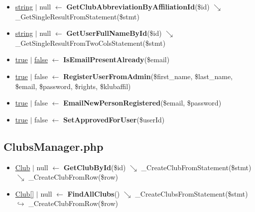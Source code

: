 \begin{itemize}
  \item \underline{string} $\vert$ null $\leftarrow$ \textbf{GetClubAbbreviationByAffiliationId}(\$id)
  \newline    $\searrow$ \_GetSingleResultFromStatement(\$stmt)
  \item \underline{string} $\vert$ null $\leftarrow$ \textbf{GetUserFullNameById}(\$id)
  \newline    $\searrow$ \_GetSingleResultFromTwoColsStatement(\$stmt)
  \item \underline{true} $\vert$ \underline{false} $\leftarrow$ \textbf{IsEmailPresentAlready}(\$email)
  \item \underline{true} $\vert$ false $\leftarrow$ \textbf{RegisterUserFromAdmin}(\$first\_name, \$last\_name,
  \newline    \$email, \$password, \$rights, \$klubaffil)
  \item \underline{true} $\vert$ false $\leftarrow$ \textbf{EmailNewPersonRegistered}(\$email,
  \newline    \$password)
  \item \underline{true} $\vert$ false $\leftarrow$ \textbf{SetApprovedForUser}(\$userId)
\end{itemize}


\subsection{ClubsManager.php}
\begin{itemize}
  \setlength\itemsep{0em}
  \item \underline{Club} $\vert$ null $\leftarrow$ \textbf{GetClubById}(\$id)
  \newline    $\searrow$ \_CreateClubFromStatement(\$stmt)
  \newline    $\searrow$ \_CreateClubFromRow(\$row)
  \item \underline{Club[]} $\vert$ null $\leftarrow$ \textbf{FindAllClubs}()
  \newline    $\searrow$ \_CreateClubsFromStatement(\$stmt)
  \newline    $\hookrightarrow$ \_CreateClubFromRow(\$row)
\end{itemize}
